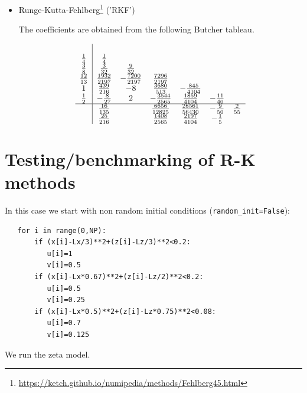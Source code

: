 \begin{itemize}
\item Runge-Kutta-Fehlberg\footnote{\url{https://ketch.github.io/numipedia/methods/Fehlberg45.html}} ('RKF')

The coefficients are obtained from the following Butcher tableau.

\begin{align} 
\begin{array}{c|cccccc} 
& & & & & & \\ 
\frac{1}{4} & \frac{1}{4} & & & & & \\ 
\frac{3}{8} & \frac{3}{32} & \frac{9}{32} & & & & \\ 
\frac{12}{13} & \frac{1932}{2197} & - \frac{7200}{2197} & \frac{7296}{2197} & & & \\ 
1 & \frac{439}{216} & -8 & \frac{3680}{513} & - \frac{845}{4104} & & \\ 
\frac{1}{2} & - \frac{8}{27} & 2 & - \frac{3544}{2565} & \frac{1859}{4104} & - \frac{11}{40} & \\ 
\hline & \frac{16}{135} & & \frac{6656}{12825} & \frac{28561}{56430} & - \frac{9}{50} & \frac{2}{55}\\ 
& \frac{25}{216} & & \frac{1408}{2565} & \frac{2197}{4104} & - \frac{1}{5} & 
\end{array}
\end{align}





\end{itemize}



\newpage
\section*{Testing/benchmarking of R-K methods}

In this case we start with non random initial conditions (\lstinline{random_init=False}):
\begin{lstlisting}
   for i in range(0,NP):
       if (x[i]-Lx/3)**2+(z[i]-Lz/3)**2<0.2:
          u[i]=1
          v[i]=0.5
       if (x[i]-Lx*0.67)**2+(z[i]-Lz/2)**2<0.2:
          u[i]=0.5
          v[i]=0.25
       if (x[i]-Lx*0.5)**2+(z[i]-Lz*0.75)**2<0.08:
          u[i]=0.7
          v[i]=0.125
\end{lstlisting}

We run the zeta model.

